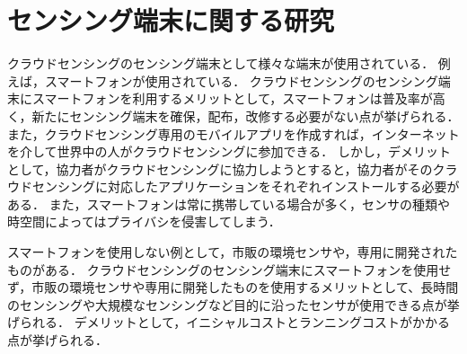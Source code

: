 \section{センシング端末に関する研究}
\label{sec:format_abst}
クラウドセンシングのセンシング端末として様々な端末が使用されている．
例えば，スマートフォンが使用されている\cite{ura}\cite{hoso}\cite{Tangmunarunkit}\cite{ohmage}\cite{Ferreira}\cite{AWARE}．
クラウドセンシングのセンシング端末にスマートフォンを利用するメリットとして，スマートフォンは普及率が高く，新たにセンシング端末を確保，配布，改修する必要がない点が挙げられる．
また，クラウドセンシング専用のモバイルアプリを作成すれば，インターネットを介して世界中の人がクラウドセンシングに参加できる．
しかし，デメリットとして，協力者がクラウドセンシングに協力しようとすると，協力者がそのクラウドセンシングに対応したアプリケーションをそれぞれインストールする必要がある．
また，スマートフォンは常に携帯している場合が多く，センサの種類や時空間によってはプライバシを侵害してしまう．

スマートフォンを使用しない例として，市販の環境センサや，専用に開発されたものがある\cite{paku}\cite{weko}\cite{amedas}\cite{S-net}．
クラウドセンシングのセンシング端末にスマートフォンを使用せず，市販の環境センサや専用に開発したものを使用するメリットとして、長時間のセンシングや大規模なセンシングなど目的に沿ったセンサが使用できる点が挙げられる．
デメリットとして，イニシャルコストとランニングコストがかかる点が挙げられる．



